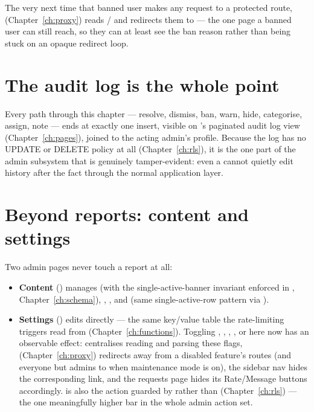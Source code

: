 The very next time that banned user makes any request to a protected route,  (Chapter~\ref{ch:proxy}) reads / and redirects them to  — the one page a banned user can still reach, so they can at least see the ban reason rather than being stuck on an opaque redirect loop.

\section{The audit log is the whole point}

Every path through this chapter — resolve, dismiss, ban, warn, hide, categorise, assign, note — ends at exactly one  insert, visible on 's paginated audit log view (Chapter~\ref{ch:pages}), joined to the acting admin's profile. Because the log has no UPDATE or DELETE policy at all (Chapter~\ref{ch:rls}), it is the one part of the admin subsystem that is genuinely tamper-evident: even a  cannot quietly edit history after the fact through the normal application layer.

\section{Beyond reports: content and settings}

Two admin pages never touch a report at all:

\begin{itemize}
  \item \textbf{Content} () manages  (with the single-active-banner invariant enforced in , Chapter~\ref{ch:schema}), , , and  (same single-active-row pattern via ).
  \item \textbf{Settings} () edits  directly — the same key/value table the rate-limiting triggers read from (Chapter~\ref{ch:functions}). Toggling , , , , or  here now has an observable effect:  centralises reading and parsing these flags,  (Chapter~\ref{ch:proxy}) redirects away from a disabled feature's routes (and everyone but admins to  when maintenance mode is on), the sidebar nav hides the corresponding link, and the requests page hides its Rate/Message buttons accordingly.  is also the action guarded by  rather than  (Chapter~\ref{ch:rls}) — the one meaningfully higher bar in the whole admin action set.
\end{itemize}

